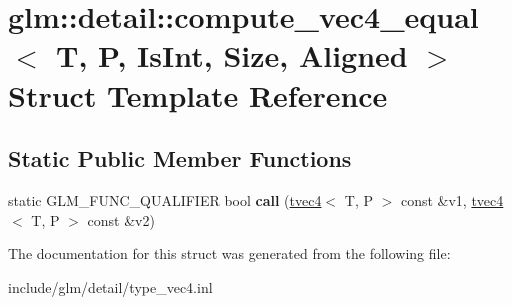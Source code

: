 \hypertarget{structglm_1_1detail_1_1compute__vec4__equal}{}\section{glm\+:\+:detail\+:\+:compute\+\_\+vec4\+\_\+equal$<$ T, P, Is\+Int, Size, Aligned $>$ Struct Template Reference}
\label{structglm_1_1detail_1_1compute__vec4__equal}
\subsection*{Static Public Member Functions}
\begin{DoxyCompactItemize}
\item 
\mbox{\label{structglm_1_1detail_1_1compute__vec4__equal_ac3dd966aa94c6de05d4c324948abab27}} 
static G\+L\+M\+\_\+\+F\+U\+N\+C\+\_\+\+Q\+U\+A\+L\+I\+F\+I\+ER bool {\bfseries call} (\hyperlink{structglm_1_1tvec4}{tvec4}$<$ T, P $>$ const \&v1, \hyperlink{structglm_1_1tvec4}{tvec4}$<$ T, P $>$ const \&v2)
\end{DoxyCompactItemize}


The documentation for this struct was generated from the following file\+:\begin{DoxyCompactItemize}
\item 
include/glm/detail/type\+\_\+vec4.\+inl\end{DoxyCompactItemize}
